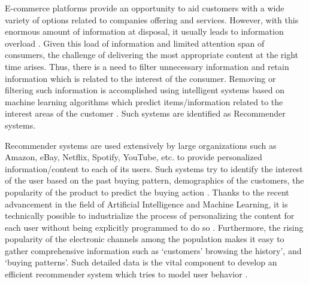 \noindent
E-commerce platforms provide an opportunity to aid customers with a wide variety of options related to companies offering and services. However, with this enormous amount of information at disposal, it usually leads to information overload \autocite[158]{SchaferJoshephKonstan1999}. Given this load of information and limited attention span of consumers, the challenge of delivering the most appropriate content at the right time arises. Thus, there is a need to filter unnecessary information and retain information which is related to the interest of the consumer. Removing or filtering such information is accomplished using intelligent systems based on machine learning algorithms which predict items/information related to the interest areas of the customer \autocite[103]{Konstan2012}. Such systems are identified as Recommender systems. \\ \par
\noindent
Recommender systems are used extensively by large organizations such as Amazon, eBay, Netflix, Spotify, YouTube, etc. to provide personalized information/content to each of its users. Such systems try to identify the interest of the user based on the past buying pattern, demographics of the customers, the popularity of the product to predict the buying action \autocite[158]{SchaferJoshephKonstan1999}. Thanks to the recent advancement in the field of Artificial Intelligence and Machine Learning, it is technically possible to industrialize the process of personalizing the content for each user without being explicitly programmed to do so \autocite[104]{Konstan2012}. Furthermore, the rising popularity of the electronic channels among the population makes it easy to gather comprehensive information such as ‘customers’ browsing the history’, and ‘buying patterns’. Such detailed data is the vital component to develop an efficient recommender system which tries to model user behavior \autocite[116]{Schafer2001}.  \\ \par
\noindent
